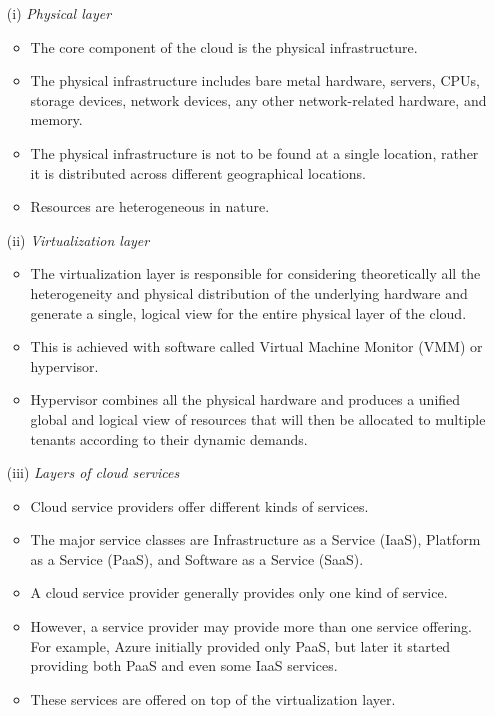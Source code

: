 \documentclass[a4paper, 12pt]{article}
\begin{document}
\newpage
\begin{itemize}
\item[(i)]
\textit{Physical layer}
\begin{itemize}
\item
The core component of the cloud is the physical infrastructure.
\item
The physical infrastructure includes bare metal hardware, servers, CPUs, storage devices, network devices, any other network-related hardware, and memory.
\item
The physical infrastructure is not to be found at a single location, rather it is distributed across different geographical locations.
\item
Resources are heterogeneous in nature. 
\end{itemize}

\item[(ii)]
\textit{Virtualization layer}
\begin{itemize}
\item
The virtualization layer is responsible for considering theoretically all the heterogeneity and physical distribution of the underlying hardware and generate a single, logical view for the entire physical layer of the cloud.
\item
This is achieved with software called Virtual Machine Monitor (VMM) or hypervisor.
\item
Hypervisor combines all the physical hardware and produces a unified global and logical view of resources that will then be allocated to multiple tenants according to their dynamic demands.
\end{itemize}

\item[(iii)]
\textit{Layers of cloud services}
\begin{itemize}
\item
Cloud service providers offer different kinds of services.
\item
The major service classes are Infrastructure as a Service (IaaS), Platform as a Service (PaaS), and Software as a Service (SaaS).
\item
A cloud service provider generally provides only one kind of service.
\item
However, a service provider may provide more than one service offering. For example, Azure initially provided only PaaS, but later it started providing both PaaS and even some IaaS services. 
\item
These services are offered on top of the virtualization layer.


\end{itemize}
\end{itemize}
\end{document}
